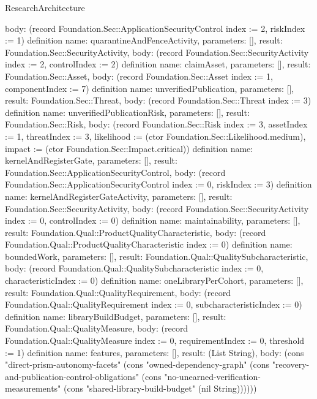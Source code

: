 \begin{lexlean}{ResearchArchitecture}
\begin{semanticmodule}
{ body: (record Foundation.Sec::ApplicationSecurityControl {index := 2, riskIndex := 1})
}
definition{
 name: quarantineAndFenceActivity,
 parameters: [],
 result: Foundation.Sec::SecurityActivity,
 body: (record Foundation.Sec::SecurityActivity {index := 2, controlIndex := 2})
}
definition{
 name: claimAsset,
 parameters: [],
 result: Foundation.Sec::Asset,
 body: (record Foundation.Sec::Asset {index := 1, componentIndex := 7})
}
definition{
 name: unverifiedPublication,
 parameters: [],
 result: Foundation.Sec::Threat,
 body: (record Foundation.Sec::Threat {index := 3})
}
definition{
 name: unverifiedPublicationRisk,
 parameters: [],
 result: Foundation.Sec::Risk,
 body: (record Foundation.Sec::Risk {index := 3, assetIndex := 1, threatIndex := 3, likelihood := (ctor Foundation.Sec::Likelihood.medium), impact := (ctor Foundation.Sec::Impact.critical)})
}
definition{
 name: kernelAndRegisterGate,
 parameters: [],
 result: Foundation.Sec::ApplicationSecurityControl,
 body: (record Foundation.Sec::ApplicationSecurityControl {index := 0, riskIndex := 3})
}
definition{
 name: kernelAndRegisterGateActivity,
 parameters: [],
 result: Foundation.Sec::SecurityActivity,
 body: (record Foundation.Sec::SecurityActivity {index := 0, controlIndex := 0})
}
definition{
 name: maintainability,
 parameters: [],
 result: Foundation.Qual::ProductQualityCharacteristic,
 body: (record Foundation.Qual::ProductQualityCharacteristic {index := 0})
}
definition{
 name: boundedWork,
 parameters: [],
 result: Foundation.Qual::QualitySubcharacteristic,
 body: (record Foundation.Qual::QualitySubcharacteristic {index := 0, characteristicIndex := 0})
}
definition{
 name: oneLibraryPerCohort,
 parameters: [],
 result: Foundation.Qual::QualityRequirement,
 body: (record Foundation.Qual::QualityRequirement {index := 0, subcharacteristicIndex := 0})
}
definition{
 name: libraryBuildBudget,
 parameters: [],
 result: Foundation.Qual::QualityMeasure,
 body: (record Foundation.Qual::QualityMeasure {index := 0, requirementIndex := 0, threshold := 1})
}
definition{
 name: features,
 parameters: [],
 result: (List String),
 body: (cons "direct-prism-autonomy-facets" (cons "owned-dependency-graph" (cons "recovery-and-publication-control-obligations" (cons "no-unearned-verification-measurements" (cons "shared-library-build-budget" (nil String))))))
}
\end{semanticmodule}
\end{lexlean}
